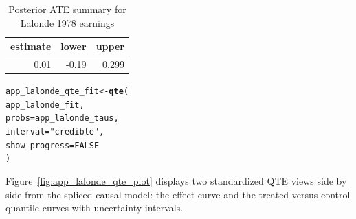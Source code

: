 \documentclass[article]{jss}\usepackage[]{graphicx}\usepackage[]{xcolor}
\makeatletter
\newcommand{\hlnum}[1]{\textcolor[rgb]{0.686,0.059,0.569}{#1}}%
\newcommand{\hlsng}[1]{\textcolor[rgb]{0.192,0.494,0.8}{#1}}%
\newcommand{\hldef}[1]{\textcolor[rgb]{0.345,0.345,0.345}{#1}}%
\newcommand{\hlkwb}[1]{\textcolor[rgb]{0.69,0.353,0.396}{#1}}%
\newcommand{\hlkwc}[1]{\textcolor[rgb]{0.333,0.667,0.333}{#1}}%
\newcommand{\hlkwd}[1]{\textcolor[rgb]{0.737,0.353,0.396}{\textbf{#1}}}%
\newenvironment{kframe}{%
 \def\at@end@of@kframe{}%
 \ifinner\ifhmode%
  \def\at@end@of@kframe{\end{minipage}}%
  \begin{minipage}{\columnwidth}%
 \fi\fi%
 \def\FrameCommand##1{\hskip\@totalleftmargin \hskip-\fboxsep
 \colorbox{shadecolor}{##1}\hskip-\fboxsep
     \hskip-\linewidth \hskip-\@totalleftmargin \hskip\columnwidth}%
 \MakeFramed {\advance\hsize-\width
   \@totalleftmargin\z@ \linewidth\hsize
   \@setminipage}}%
 {\par\unskip\endMakeFramed%
 \at@end@of@kframe}
\newenvironment{knitrout}{}{} %
\makeatother
\begin{document}
\begin{table}[!h]
\centering
\caption{\label{tab:app_lalonde_ate-results}Posterior ATE summary for Lalonde 1978 earnings}
\centering
\fontsize{8}{10}\selectfont
\begin{tabular}[t]{rrr}
\toprule
estimate & lower & upper\\
\midrule
0.01 & -0.19 & 0.299\\
\bottomrule
\end{tabular}
\end{table}



\begin{knitrout}\footnotesize
{}\color{fgcolor}\begin{kframe}
\begin{alltt}
\hldef{app_lalonde_qte_fit} \hlkwb{<-} \hlkwd{qte}\hldef{(}
  \hldef{app_lalonde_fit,}
  \hlkwc{probs} \hldef{= app_lalonde_taus,}
  \hlkwc{interval} \hldef{=} \hlsng{"credible"}\hldef{,}
  \hlkwc{show_progress} \hldef{=} \hlnum{FALSE}
\hldef{)}
\end{alltt}
\end{kframe}
\end{knitrout}

Figure~\ref{fig:app_lalonde_qte_plot} displays two standardized QTE
views side by side from the spliced causal model: the effect curve and
the treated-versus-control quantile curves with uncertainty intervals.
\end{document}
